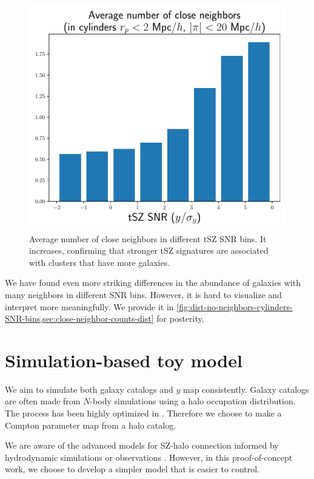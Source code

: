 \begin{figure}[hbtp]
    \centering
    \includegraphics[width=\linewidth]{fig/close_neighbor_counts_cylinders-Y1_rp2_pi20.0-avg-no.pdf}
    \caption[Average number of close neighbors in different tSZ SNR bins]{Average number of close neighbors in different tSZ SNR bins.
    It increases, confirming that stronger tSZ signatures are associated with clusters that have more galaxies.}
    \label{fig:avg-no-close-neighbors-cylinders-SNR-bins}
\end{figure}

We have found even more striking differences in the abundance of galaxies with many neighbors in different SNR bins.
However, it is hard to visualize and interpret more meaningfully.
We provide it in \cref{fig:dist-no-neighbors-cylinders-SNR-bins,sec:close-neighbor-counts-dist} for posterity.

\section{Simulation-based toy model}
\label{sec:DESI-tSZ:mock}

We aim to simulate both galaxy catalogs and $y$ map consistently.
Galaxy catalogs are often made from $N$-body simulations using a halo occupation distribution.
The process has been highly optimized in \abacushod{} \citep{AbacusHOD}.
Therefore we choose to make a Compton parameter map from a halo catalog.

We are aware of the advanced models for SZ-halo connection informed by hydrodynamic simulations or observations \citep[e.g.,][]{simulations-websky,baryon-pasting-algorithm,fast-baryon-painting-Liu}.
However, in this proof-of-concept work, we choose to develop a simpler model that is easier to control.

